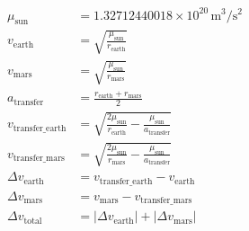 \begin{align*}
    \mu_{\text{sun}} &= 1.32712440018 \times 10^{20} \, \text{m}^3/\text{s}^2 \\
    v_{\text{earth}} &= \sqrt{\frac{\mu_{\text{sun}}}{r_{\text{earth}}}} \\
    v_{\text{mars}} &= \sqrt{\frac{\mu_{\text{sun}}}{r_{\text{mars}}}} \\
    a_{\text{transfer}} &= \frac{r_{\text{earth}} + r_{\text{mars}}}{2} \\
    v_{\text{transfer\_earth}} &= \sqrt{\frac{2\mu_{\text{sun}}}{r_{\text{earth}}} - \frac{\mu_{\text{sun}}}{a_{\text{transfer}}}} \\
    v_{\text{transfer\_mars}} &= \sqrt{\frac{2\mu_{\text{sun}}}{r_{\text{mars}}} - \frac{\mu_{\text{sun}}}{a_{\text{transfer}}}} \\
    \Delta v_{\text{earth}} &= v_{\text{transfer\_earth}} - v_{\text{earth}} \\
    \Delta v_{\text{mars}} &= v_{\text{mars}} - v_{\text{transfer\_mars}} \\
    \Delta v_{\text{total}} &= \lvert \Delta v_{\text{earth}} \rvert + \lvert \Delta v_{\text{mars}} \rvert
\end{align*}